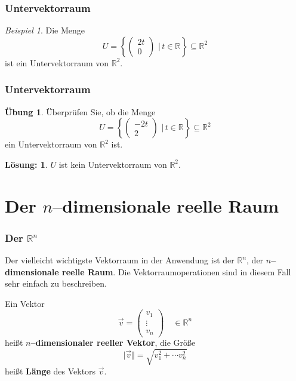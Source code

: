 \documentclass[hyperref={pdfpagelabels=false}]{beamer}
\theoremstyle{plain}%
\theoremstyle{definition}
\newtheorem*{uebung}{Übung}
\newtheorem*{sol}{Lösung:}
\theoremstyle{remark}
\newtheorem*{beispiel}{Beispiel}
\def \R{\mathbb R}
\newcommand{\vektor}[1]{\overrightarrow{#1}}
\begin{document}
\begin{frame}
\frametitle{Untervektorraum}

\begin{beispiel}
Die Menge 
	$$ U = \left\{ \begin{pmatrix} 2 t \\ 0 \end{pmatrix} \, \, \vert \, t \in \R \right\} 
	\subseteq \R^2 $$
ist ein Untervektorraum von $\R^2$. 
\end{beispiel}

\end{frame}


\begin{frame}
\frametitle{Untervektorraum}

\begin{uebung}
Überprüfen Sie, ob die Menge 
	$$ U = \left\{ \begin{pmatrix} -2 t \\ 2 \end{pmatrix} \, \, \vert \, t \in \R \right\} 
	\subseteq \R^2 $$
ein Untervektorraum von $\R^2$ ist. 
\end{uebung}

\pause \pause 
\bigbreak

\begin{sol}
 $U$ ist kein Untervektorraum von $\R^2$. 
\end{sol}
\end{frame}

\section{Der $n$--dimensionale reelle Raum}

\begin{frame}
\frametitle{Der $\R^n$}

Der vielleicht wichtigste Vektorraum in der Anwendung ist der $\R^n$, der \textbf{$n$--dimensionale 
reelle Raum}. \pause Die Vektorraumoperationen sind in diesem Fall sehr einfach zu beschreiben. 

\pause 

\begin{definition}
Ein Vektor 
	$$ \vektor{v} = \begin{pmatrix} v_1 \\ \vdots \\ v_n \end{pmatrix} \quad \in \R^n $$
heißt \textbf{$n$--dimensionaler reeller Vektor}, die Größe
	$$ \vert \vektor{v} \Vert = \sqrt{v_1^2 + \cdots v_n^2} $$
heißt \textbf{Länge} des Vektors $\vektor{v}$.
\end{definition}
\end{frame}
\end{document}
